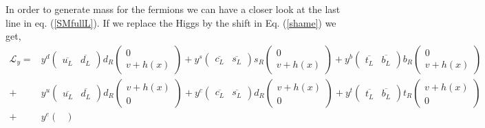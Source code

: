 \documentclass[12pt]{article}
\begin{document}
In order to generate mass for the fermions we can have a closer look at the last line in eq. (\ref{SMfullL}). If we replace the Higgs by the shift in Eq. (\ref{shame}) we get, 
%
%
\begin{align}
\mathcal{L}_y = & y^d 
\begin{pmatrix}
\overline{u_L} & \overline{d_L} 
\end{pmatrix} d_R 
\begin{pmatrix}
0\\ v + h(x)
\end{pmatrix} + 
y^s 
\begin{pmatrix}
\overline{c_L} & \overline{s_L} 
\end{pmatrix} s_R 
\begin{pmatrix}
0 \\ v + h(x)
\end{pmatrix} +
 y^b 
\begin{pmatrix}
\overline{t_L} & \overline{b_L} 
\end{pmatrix} b_R 
\begin{pmatrix}
0 \\ v + h(x)
\end{pmatrix}  \nonumber  \\ + &  
 y^u 
\begin{pmatrix}
\overline{u_L} & \overline{d_L} 
\end{pmatrix} d_R 
\begin{pmatrix}
v + h(x) \\ 0
\end{pmatrix}
+  y^c 
\begin{pmatrix}
\overline{c_L} & \overline{s_L} 
\end{pmatrix} d_R 
\begin{pmatrix}
v + h(x) \\ 0 
\end{pmatrix} +
y^t
\begin{pmatrix}
\overline{t_L} & \overline{b_L} 
\end{pmatrix} t_R \begin{pmatrix}
 v + h(x) \\ 0
\end{pmatrix}  \\ 
 +  & y^e 
\begin{pmatrix}

\end{pmatrix}
\end{align}
\end{document}
